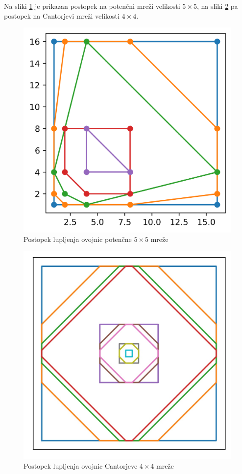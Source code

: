 \documentclass[a4paper]{article}
\begin{document}
\newpage
Na sliki \ref{fig:5x5} je prikazan postopek na potenčni mreži velikosti $5 \times 5$, na sliki \ref{fig:cantor} pa postopek na Cantorjevi mreži velikosti $4 \times 4$.

\begin{figure}[!h]
	\centering
	\caption{Postopek lupljenja ovojnic potenčne $5 \times 5$ mreže}
	\label{fig:5x5}
	\includegraphics[scale=0.6]{slike/5x5_potencna.png}
\end{figure}

\begin{figure}[!h]
	\centering
	\caption{Postopek lupljenja ovojnic Cantorjeve $4 \times 4$ mreže}
	\label{fig:cantor}
	\includegraphics[scale=0.6]{slike/kvazi_cantor.jpg}
\end{figure}
\end{document}
